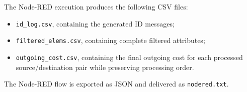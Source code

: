 \documentclass[a4paper,11pt]{article}
\begin{document}
The Node-RED execution produces the following CSV files:

\begin{itemize}
    \item \texttt{id\_log.csv}, containing the generated ID messages;
    \item \texttt{filtered\_elems.csv}, containing complete filtered attributes;
    \item \texttt{outgoing\_cost.csv}, containing the final outgoing cost for
    each processed source/destination pair while preserving processing order.
\end{itemize}

The Node-RED flow is exported as JSON and delivered as \texttt{nodered.txt}.
\end{document}
